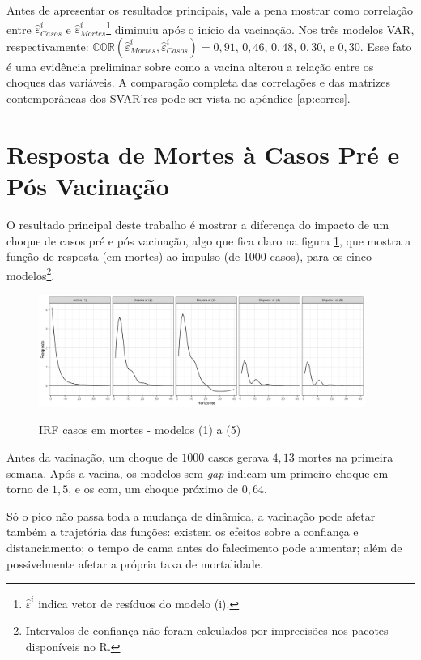 \documentclass[
    article,
	12pt,				%
	oneside,			%
	a4paper,			%
	english,			%
	brazil,				%
	hyperref = {colorlinks, citecolor=c1d, linkcolor=c2d, urlcolor=c3d, colorlinks}
	]{abntex2}
\newcounter{j}
\begin{document}
Antes de apresentar os resultados principais, vale a pena mostrar como correlação entre $\hat{\varepsilon}^i_{Casos}$ e $\hat{\varepsilon}^i_{Mortes}$\footnote{$\hat{\varepsilon}^i$ indica vetor de resíduos do modelo (i).} diminuiu após o início da vacinação. Nos três modelos VAR, respectivamente: $\mathbb{COR}(\hat{\varepsilon}^i_{Mortes}, \hat{\varepsilon}^i_{Casos}) = 0,91$, $0,46$, $0,48$, $0,30$, e $0,30$. Esse fato é uma evidência preliminar sobre como a vacina alterou a relação entre os choques das variáveis. A comparação completa das correlações e das matrizes contemporâneas dos SVAR'res pode ser vista no apêndice \ref{ap:corres}.


\section{Resposta de Mortes à Casos Pré e Pós Vacinação}\label{sec:res1}

O resultado principal deste trabalho é mostrar a diferença do impacto de um choque de casos pré e pós vacinação, algo que fica claro na figura \ref{fig:IRF BaA}, que mostra a função de resposta (em mortes) ao impulso (de $1000$ casos), para os cinco modelos\footnote{Intervalos de confiança não foram calculados por imprecisões nos pacotes disponíveis no R.}.

\begin{figure}[H]
    \centering
    \caption{IRF casos em mortes - modelos (1) a (5)}
    \includegraphics[width = 0.95\textwidth]{Figuras/res1_irfs.png}
    \label{fig:IRF BaA}
\end{figure}

Antes da vacinação, um choque de $1000$ casos gerava $4,13$ mortes na primeira semana. Após a vacina, os modelos sem \textit{gap} indicam um primeiro choque em torno de $1,5$, e os com, um choque próximo de $0,64$.

Só o pico não passa toda a mudança de dinâmica, a vacinação pode afetar também a trajetória das funções: existem os efeitos sobre a confiança e distanciamento; o tempo de cama antes do falecimento pode aumentar; além de possivelmente afetar a própria taxa de mortalidade.
\end{document}
